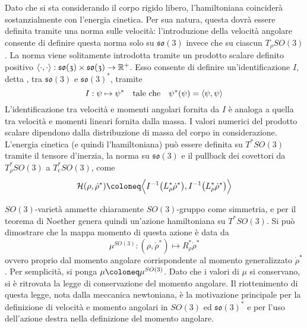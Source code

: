 Dato che si sta considerando il corpo rigido libero, l'hamiltoniana coinciderà sostanzialmente con l'energia cinetica. Per sua natura, questa dovrà essere definita tramite una norma sulle velocità: l'introduzione della velocità angolare consente di definire questa norma solo su $\mathfrak{so(3)}$ invece che su ciascun $T_{\rho}SO(3)$. La norma viene solitamente introdotta tramite un prodotto scalare definito positivo $\langle \cdot, \cdot\rangle: \mathfrak{so(3)} \times  \mathfrak{so(3)} \to \mathbb{R}^+$. Esso consente di definire un'identificazione $I$, detta , tra $\mathfrak{so(3)}$ e $\mathfrak{so(3)}^*$, tramite
\begin{equation}
I: \psi \mapsto \psi^* \qqtext{tale che} \psi^* (\psi) = \langle \psi, \psi \rangle
\end{equation} 
L'identificazione tra velocità e momenti angolari fornita da $I$ è analoga a quella tra velocità e momenti lineari fornita dalla massa. I valori numerici del prodotto scalare dipendono dalla distribuzione di massa del corpo in considerazione. L'energia cinetica (e quindi l'hamiltoniana) può essere definita su $T^* SO(3)$ tramite il tensore d'inerzia, la norma su $\mathfrak{so(3)}$ e il pullback dei covettori da $T^*_{\rho}SO(3)$ a $T^*_{e}SO(3)$, come
\begin{equation}
\mathcal{H}(\rho, \dot{\rho}^*) \defeq \Big\langle I^{-1}\big(L^*_\rho \dot{\rho}^*\big), I^{-1}\big(L^*_\rho \dot{\rho}^*\big) \Big\rangle
\end{equation}

$SO(3)$-varietà ammette chiaramente $SO(3)$-gruppo come simmetria, e per il teorema di Noether genera quindi un'azione hamiltoniana su $T^*SO(3)$. Si può dimostrare che la mappa momento di questa azione è data da 
\begin{equation}
\mu^{SO(3)}: (\rho, \dot{\rho}^*) \longmapsto R_{\rho}^* \dot{\rho}^* 
\end{equation}
ovvero proprio dal momento angolare corrispondente al momento generalizzato $\dot{\rho}^*$. Per semplicità, si ponga $\mu \defeq \mu^{SO(3)}$. Dato che i valori di $\mu$ si conservano, si è ritrovata la legge di conservazione del momento angolare. Il riottenimento di questa legge, nota dalla meccanica newtoniana, è la motivazione principale per la definizione di velocità e momento angolari in $SO(3)$ ed $\mathfrak{so(3)}^*$ e per l'uso dell'azione destra nella definizione del momento angolare.

